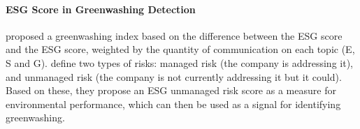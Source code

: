 \paragraph{ESG Score in Greenwashing Detection} \citet{LEE_greenwashing} proposed a greenwashing index based on the difference between the ESG score and the ESG score, weighted by the quantity of communication on each topic (E, S and G). 
\citet{Greenscreen} define two types of risks: managed risk (the company is addressing it), and unmanaged risk (the company is not currently addressing it but it could). Based on these, they propose an ESG unmanaged risk score as a measure for environmental performance, which can then be used as a signal for identifying greenwashing.






